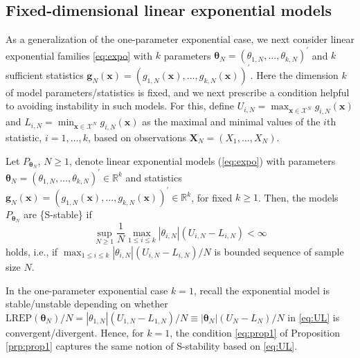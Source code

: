 \documentclass[]{article}
\theoremstyle{definition}
\newcommand{\REP}{\mathrm{LREP}}
\let\BeginKnitrBlock\begin \let\EndKnitrBlock\end
\begin{document}
\subsection{Fixed-dimensional linear exponential
models}\label{fixed-dim-exp}

As a generalization of the one-parameter exponential case, we next
consider linear exponential families \eqref{eq:expo} with \(k\) parameters
\(\boldsymbol \theta_N = (\theta_{1,N},\ldots,\theta_{k,N})^\prime\) and
\(k\) sufficient statistics
\(\boldsymbol g_N(\boldsymbol x) = (g_{1,N}(\boldsymbol x),\ldots, g_{k,N}(\boldsymbol x))^\prime\).
Here the dimension \(k\) of model parameters/statistics is fixed, and we
next prescribe a condition helpful to avoiding instability in such
models. For this, define
\(U_{i,N}=\max_{\boldsymbol x \in\mathcal{X}^N} g_{i,N}(\boldsymbol x)\)
and
\(L_{i,N}=\min_{\boldsymbol x \in\mathcal{X}^N} g_{i,N}(\boldsymbol x)\)
as the maximal and minimal values of the \(i\)th statistic,
\(i=1,\ldots,k\), based on observations
\(\boldsymbol X_N=(X_1,\ldots,X_N)\).

\BeginKnitrBlock{proposition}
\protect\hypertarget{prp:prop1}{}{\label{prp:prop1}}Let
\(P_{\boldsymbol \theta_N}\), \(N \geq 1\), denote linear exponential
models (\ref{eq:expo}) with parameters
\(\boldsymbol \theta_N = (\theta_{1,N},\ldots,\theta_{k,N})^\prime \in \mathbb{R}^k\)
and statistics
\(\boldsymbol g_N(\boldsymbol x) = (g_{1,N}(\boldsymbol x),\ldots, g_{k,N}(\boldsymbol x))^\prime \in \mathbb{R}^k\),
for fixed \(k \geq 1\). Then, the models \(P_{\boldsymbol \theta_N}\)
are \{\rm S-stable\} if
\begin{equation}
\label{eq:prop1}
\sup_{N \geq 1}\frac{1}{N} \max_{1 \leq i \leq k }|\theta_{i,N}|(U_{i,N}-L_{i,N})<\infty
\end{equation}
holds, i.e., if
\(\max_{1 \leq i \leq k } |\theta_{i,N}|(U_{i,N}-L_{i,N})/N\) is bounded
sequence of sample size \(N\).
\EndKnitrBlock{proposition}

\BeginKnitrBlock{remark}
\iffalse <span class="remark"><em>Remark. \fi{} In the one-parameter
exponential case \(k=1\), recall the exponential model is
stable/unstable depending on whether
\(\REP(\boldsymbol \theta_N)/N = |\theta_{1,N}|(U_{1,N}-L_{1,N})/N \equiv |\boldsymbol \theta_{N}|(U_{N}-L_{N})/N\)
in \eqref{eq:UL} is convergent/divergent. Hence, for \(k=1\), the
condition \eqref{eq:prop1} of Proposition \ref{prp:prop1} captures the
same notion of S-stability based on \eqref{eq:UL}.
\EndKnitrBlock{remark}
\end{document}
